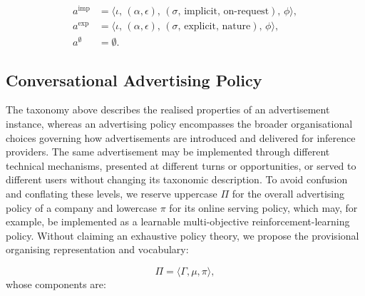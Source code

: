 \documentclass[english]{article}
\begin{document}
\begin{align}
    a^{\mathrm{imp}}
    &= \bigl\langle \iota,\,(\alpha,\epsilon),\,(\sigma,\,\mathrm{implicit},\,\mathrm{on\text{-}request}),\,\phi \bigr\rangle,
    \label{eq:ad-implicit}
    \\
    a^{\mathrm{exp}}
    &= \bigl\langle \iota,\,(\alpha,\epsilon),\,(\sigma,\,\mathrm{explicit},\,\mathrm{nature}),\,\phi \bigr\rangle,
    \label{eq:ad-explicit}
    \\
    a^{\emptyset}
    &= \emptyset.
    \label{eq:ad-null}
\end{align}


\color{black}


\subsection{Conversational Advertising Policy}
\label{subsec:ad-policy}

The taxonomy above describes the realised properties of an advertisement
instance, whereas an advertising policy encompasses the broader organisational choices governing how advertisements are introduced and delivered for inference providers. The same advertisement may be implemented through different technical mechanisms, presented at different turns or opportunities, or served to different users without changing its taxonomic description. To avoid confusion and conflating these levels, we reserve uppercase \(\Pi\) for the overall advertising policy of a
company and lowercase \(\pi\) for its online serving policy, which may, for example, be implemented as a learnable multi-objective reinforcement-learning policy. Without claiming an exhaustive policy theory, we propose the provisional organising representation and vocabulary:

\begin{equation}
    \Pi = \langle\Gamma,\mu,\pi\rangle,
    \label{eq:platform-ad-policy}
\end{equation}
whose components are:
\end{document}
